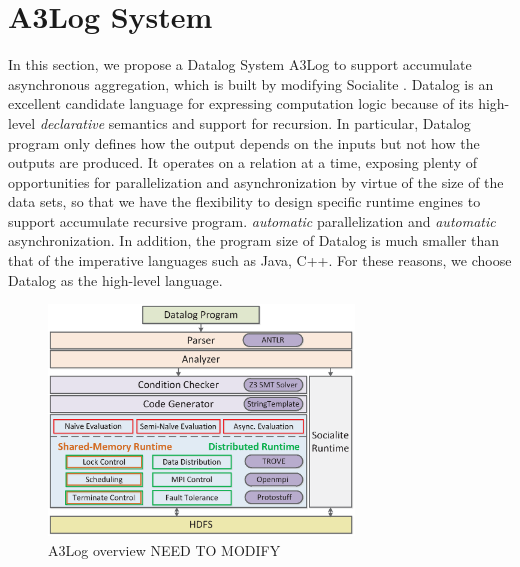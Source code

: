 \section{A3Log System}
\label{sec:system}

In this section, we propose a Datalog System A3Log to support accumulate asynchronous aggregation, which is built by modifying Socialite \cite{Lam:2013:SDE:2510649.2511289,Seo:2013:DSD:2556549.2556572}. Datalog is an excellent candidate language for expressing computation logic because of its high-level \emph{declarative} semantics and support for recursion. In particular, Datalog program only defines how the output depends on the inputs but not how the outputs are produced. It operates on a relation at a time, exposing plenty of opportunities for parallelization and asynchronization by virtue of the size of the data sets, so that we have the flexibility to design specific runtime engines to support accumulate recursive program. \emph{automatic} parallelization and \emph{automatic} asynchronization. In addition, the program size of Datalog is much smaller than that of the imperative languages such as Java, C++. For these reasons, we choose Datalog as the high-level language.

\begin{figure}[!t]
    \centering
  \includegraphics[width=3.2in]{fig/overview2}
  \vspace{-0.1in}
  \caption{A3Log overview NEED TO MODIFY}
  \label{fig:overview}
  \vspace{-0.2in}
\end{figure}

